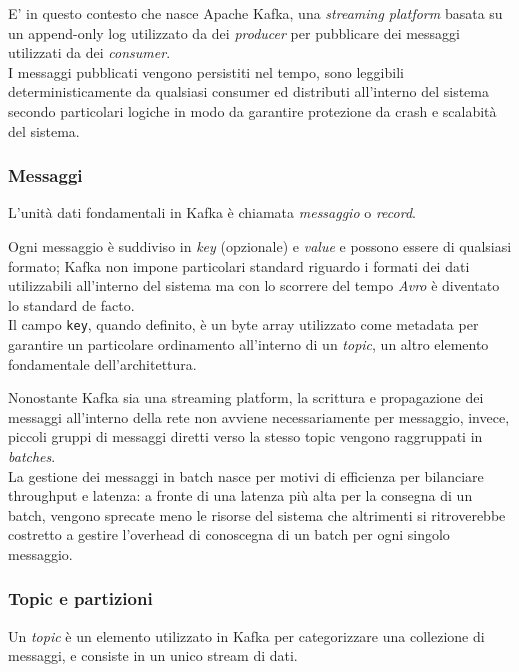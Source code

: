 \documentclass[]{article}
\begin{document}
E' in questo contesto che nasce Apache Kafka, una \emph{streaming
platform} basata su un append-only log utilizzato da dei \emph{producer}
per pubblicare dei messaggi utilizzati da dei \emph{consumer}.\\
I messaggi pubblicati vengono persistiti nel tempo, sono leggibili
deterministicamente da qualsiasi consumer ed distributi all'interno del
sistema secondo particolari logiche in modo da garantire protezione da
crash e scalabità del sistema.

\newpage

\subsubsection{Messaggi}\label{messaggi}

L'unità dati fondamentali in Kafka è chiamata \emph{messaggio} o
\emph{record}.

Ogni messaggio è suddiviso in \emph{key} (opzionale) e \emph{value} e
possono essere di qualsiasi formato; Kafka non impone particolari
standard riguardo i formati dei dati utilizzabili all'interno del
sistema ma con lo scorrere del tempo \emph{Avro} è diventato lo standard
de facto.\\
Il campo \texttt{key}, quando definito, è un byte array utilizzato come
metadata per garantire un particolare ordinamento all'interno di un
\emph{topic}, un altro elemento fondamentale dell'architettura.

Nonostante Kafka sia una streaming platform, la scrittura e propagazione
dei messaggi all'interno della rete non avviene necessariamente per
messaggio, invece, piccoli gruppi di messaggi diretti verso la stesso
topic vengono raggruppati in \emph{batches}.\\
La gestione dei messaggi in batch nasce per motivi di efficienza per
bilanciare throughput e latenza: a fronte di una latenza più alta per la
consegna di un batch, vengono sprecate meno le risorse del sistema che
altrimenti si ritroverebbe costretto a gestire l'overhead di conoscegna
di un batch per ogni singolo messaggio.

\newpage

\subsubsection{Topic e partizioni}\label{topic-e-partizioni}

Un \emph{topic} è un elemento utilizzato in Kafka per categorizzare una
collezione di messaggi, e consiste in un unico stream di dati.
\end{document}
